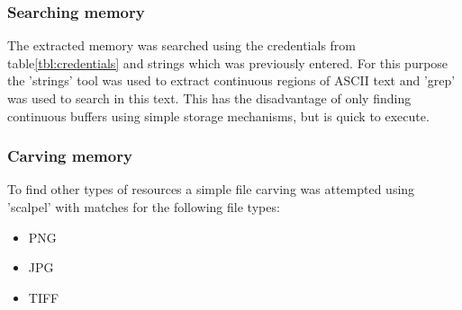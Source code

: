 \subsubsection{Searching memory}
The extracted memory was searched using the credentials from table\ref{tbl:credentials} and strings which was previously entered. For this purpose the 'strings' tool was used to extract continuous regions of ASCII text and 'grep' was used to search in this text. This has the disadvantage of only finding continuous buffers using simple storage mechanisms, but is quick to execute.

\subsubsection{Carving memory}
To find other types of resources a simple file carving was attempted using 'scalpel' with matches for the following file types:
\begin{itemize}
	\item PNG
	\item JPG
	\item TIFF
\end{itemize}
